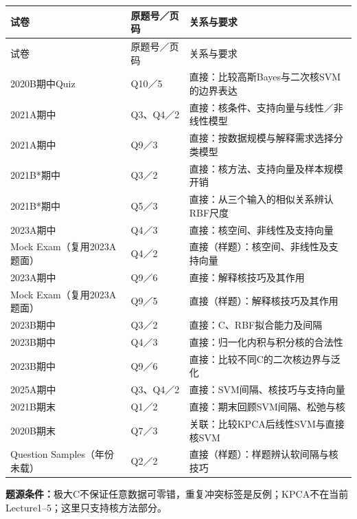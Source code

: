 \begingroup\small\setlength{\tabcolsep}{3pt}\renewcommand{\arraystretch}{1.22}
\begin{longtable}{@{}>{\raggedright\arraybackslash}p{}>{\raggedright\arraybackslash}p{}>{\raggedright\arraybackslash}p{}@{}}
\toprule
试卷 & 原题号／页码 & 关系与要求 \\
\midrule\endfirsthead
试卷 & 原题号／页码 & 关系与要求 \\
\midrule\endhead
\bottomrule\endfoot
2020B期中Quiz & Q10／5 & 直接：比较高斯Bayes与二次核SVM的边界表达 \\
2021A期中 & Q3、Q4／2 & 直接：核条件、支持向量与线性／非线性模型 \\
2021A期中 & Q9／3 & 直接：按数据规模与解释需求选择分类模型 \\
2021B*期中 & Q3／2 & 直接：核方法、支持向量及样本规模开销 \\
2021B*期中 & Q5／3 & 直接：从三个输入的相似关系辨认RBF尺度 \\
2023A期中 & Q4／3 & 直接：核空间、非线性及支持向量 \\
Mock Exam（复用2023A题面） & Q4／2 & 直接（样题）：核空间、非线性及支持向量 \\
2023A期中 & Q9／6 & 直接：解释核技巧及其作用 \\
Mock Exam（复用2023A题面） & Q9／5 & 直接（样题）：解释核技巧及其作用 \\
2023B期中 & Q3／2 & 直接：C、RBF拟合能力及间隔 \\
2023B期中 & Q4／3 & 直接：归一化内积与积分核的合法性 \\
2023B期中 & Q9／6 & 直接：比较不同C的二次核边界与泛化 \\
2025A期中 & Q3、Q4／2 & 直接：SVM间隔、核技巧与支持向量 \\
2021B期末 & Q1／2 & 直接：期末回顾SVM间隔、松弛与核 \\
2020B期末 & Q7／3 & 关联：比较KPCA后线性SVM与直接核SVM \\
Question Samples（年份未载） & Q2／2 & 直接（样题）：样题辨认软间隔与核技巧 \\
\end{longtable}\endgroup

\textbf{题源条件：}极大C不保证任意数据可零错，重复冲突标签是反例；KPCA不在当前Lecture1–5；这里只支持核方法部分。


